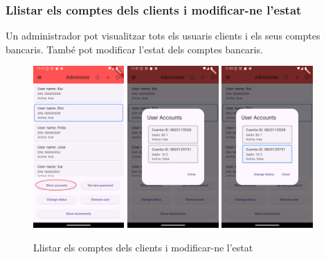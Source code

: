 \documentclass[a4paper,12pt,twoside]{ThesisStyle}
\begin{document}
\clearpage
\subsubsection{Llistar els comptes dels clients i modificar-ne l'estat}
\label{subsubsec:Llistar els comptes dels clients i modificar-ne l'estat}

Un administrador pot visualitzar tots els usuaris clients i els seus comptes bancaris. També pot modificar l'estat dels comptes bancaris.

\begin{figure}[h]
    \centering
    \includegraphics[width=0.31\textwidth]{imatges/mainAdmin1.png}
    \includegraphics[width=0.31\textwidth]{imatges/userAccounts1.png}
    \includegraphics[width=0.31\textwidth]{imatges/userAccounts2.png}
    \caption{Llistar els comptes dels clients i modificar-ne l'estat}
    \label{fig: Llistar els comptes dels clients i modificar-ne l'estat}
\end{figure}
\end{document}
